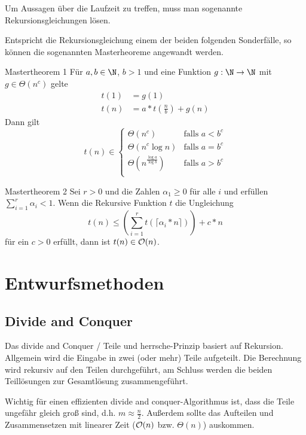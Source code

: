 Um Aussagen über die Laufzeit zu treffen, muss man sogenannte Rekursionsgleichungen lösen.

Entspricht die Rekursionsgleichung einem der beiden folgenden Sonderfälle, so können die sogenannten Masterheoreme angewandt werden.
\begin{satz}{Mastertheorem 1}
	Für $a,b\in\N$, $b>1$ und eine Funktion $g:\N\rightarrow \N$ mit $g\in\Theta(n^c)$ gelte
	\begin{align*}
		t(1)&=g(1)\\
		t(n)&=a*t\left(\frac nb\right)+g(n)
	\end{align*}
	Dann gilt 
	\begin{equation*}
		t(n)\in\begin{cases}
		\Theta(n^c)&\text{falls }a<b^c\\
		\Theta(n^c\log n)&\text{falls }a=b^c\\
		\Theta(n^{\frac{\log a}{\log b}})&\text{falls }a>b^c\\
		\end{cases}
	\end{equation*}
\end{satz}

\begin{satz}{Mastertheorem 2}
	Sei $r>0$ und die Zahlen $\alpha_1\geq 0$ für alle $i$ und erfüllen $\sum_{i=1}^r\alpha_i<1$.
	Wenn die Rekursive Funktion $t$ die Ungleichung
	\begin{equation*}
		t(n)\leq \left( \sum_{i=1}^r t(\lceil \alpha_i*n\rceil) \right)+c*n
	\end{equation*}
	für ein $c>0$ erfüllt, dann ist $t(n)\in\mathcal O(n)$.
\end{satz}


\chapter{Entwurfsmethoden}
\section{Divide and Conquer}
Das divide and Conquer / Teile und herrsche-Prinzip basiert auf Rekursion. Allgemein wird die Eingabe in zwei (oder mehr) Teile aufgeteilt. Die Berechnung wird rekursiv auf den Teilen durchgeführt, am Schluss werden die beiden Teillösungen zur Gesamtlösung zusammengeführt.

Wichtig für einen effizienten divide and conquer-Algorithmus ist, dass die Teile ungefähr gleich groß sind, d.h. $m\approx \frac n2$. Außerdem sollte das Aufteilen und Zusammensetzen mit linearer Zeit ($\mathcal O(n)$ bzw. $\Theta(n)$) auskommen.

